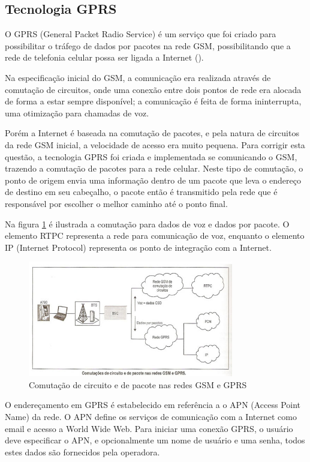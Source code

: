 \subsection {Tecnologia GPRS}

O GPRS (General Packet Radio Service) é um serviço que foi criado para possibilitar o tráfego de dados por pacotes na rede GSM, possibilitando que a rede de telefonia celular possa ser ligada a Internet (\textcite{3gpp:2001}).

Na especificação inicial do GSM, a comunicação era realizada através de comutação de circuitos, onde uma conexão entre dois pontos de rede era alocada de forma a estar sempre disponível; a comunicação é feita de forma ininterrupta, uma otimização para chamadas de voz.

Porém a Internet é baseada na comutação de pacotes, e pela natura de circuitos da rede GSM inicial, a velocidade de acesso era muito pequena. Para corrigir esta questão, a tecnologia GPRS foi criada e implementada se comunicando o GSM, trazendo a comutação de pacotes para a rede celular. Neste tipo de comutação, o ponto de origem envia uma informação dentro de um pacote que leva o endereço de destino em seu cabeçalho, o pacote então é transmitido pela rede que é responsável por escolher o melhor caminho até o ponto final.

Na figura \ref{fig:gprscom} é ilustrada a comutação para dados de voz e dados por pacote. O elemento RTPC representa a rede para comunicação de voz, enquanto o elemento IP (Internet Protocol) representa os ponto de integração com a Internet.

\begin{figure}[h!]
			\centering
			\includegraphics[width=0.8\textwidth]{figures/gprs.jpg}
			\caption{Comutação de circuito e de pacote nas redes GSM e GPRS}
			\label{fig:gprscom}
\end{figure}

O endereçamento em GPRS é estabelecido em referência a o APN (Access Point Name) da rede. O APN define os serviços de comunicação com a Internet como email e acesso a World Wide Web. Para iniciar uma conexão GPRS, o usuário deve especificar o APN, e opcionalmente um nome de usuário e uma senha, todos estes dados são fornecidos pela operadora. 

